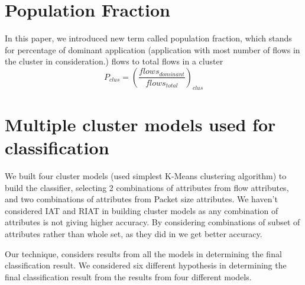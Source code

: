 \documentclass[conference]{IEEEtran}
\begin{document}
\section{Population Fraction}
In this paper, we introduced new term called population fraction, which stands for percentage of dominant application (application with most number of flows in the cluster in consideration.) flows to total flows in a cluster
\begin{equation}
P_{clus} = (\frac{flows_{dominant}}{flows_{total}})_{clus}
\end{equation}
\section{Multiple cluster models used for classification}
We built four cluster models (used simplest K-Means clustering algorithm) to build the classifier, selecting 2 combinations of attributes from flow attributes, and two combinations of attributes from Packet size attributes. We haven't considered IAT and RIAT in building cluster models as any combination of attributes is not giving higher accuracy. By considering combinations of subset of attributes rather than whole set, as they did in \cite{} we get better accuracy.

Our technique, considers results from all the models in determining the final classification result. We considered six different hypothesis in determining the final classification result from the results from four different models.
\end{document}

